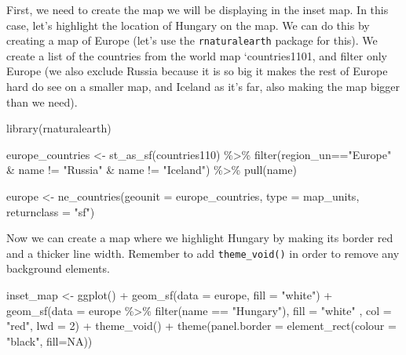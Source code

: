 \documentclass[
]{book}
\newenvironment{Shaded}{\begin{snugshade}}{\end{snugshade}}
\newcommand{\AttributeTok}[1]{\textcolor[rgb]{0.77,0.63,0.00}{#1}}
\newcommand{\ConstantTok}[1]{\textcolor[rgb]{0.00,0.00,0.00}{#1}}
\newcommand{\DecValTok}[1]{\textcolor[rgb]{0.00,0.00,0.81}{#1}}
\newcommand{\FunctionTok}[1]{\textcolor[rgb]{0.00,0.00,0.00}{#1}}
\newcommand{\NormalTok}[1]{#1}
\newcommand{\OtherTok}[1]{\textcolor[rgb]{0.56,0.35,0.01}{#1}}
\newcommand{\SpecialCharTok}[1]{\textcolor[rgb]{0.00,0.00,0.00}{#1}}
\newcommand{\StringTok}[1]{\textcolor[rgb]{0.31,0.60,0.02}{#1}}
\begin{document}
First, we need to create the map we will be displaying in the inset map. In this case, let's highlight the location of Hungary on the map. We can do this by creating a map of Europe (let's use the \texttt{rnaturalearth} package for this). We create a list of the countries from the world map `countries1101, and filter only Europe (we also exclude Russia because it is so big it makes the rest of Europe hard do see on a smaller map, and Iceland as it's far, also making the map bigger than we need).

\begin{Shaded}
\begin{Highlighting}[]
\FunctionTok{library}\NormalTok{(rnaturalearth)}

\NormalTok{europe\_countries }\OtherTok{\textless{}{-}} \FunctionTok{st\_as\_sf}\NormalTok{(countries110) }\SpecialCharTok{\%\textgreater{}\%} 
  \FunctionTok{filter}\NormalTok{(region\_un}\SpecialCharTok{==}\StringTok{"Europe"} \SpecialCharTok{\&}\NormalTok{ name }\SpecialCharTok{!=} \StringTok{"Russia"} \SpecialCharTok{\&}\NormalTok{ name }\SpecialCharTok{!=} \StringTok{"Iceland"}\NormalTok{) }\SpecialCharTok{\%\textgreater{}\%} \FunctionTok{pull}\NormalTok{(name)}

\NormalTok{europe }\OtherTok{\textless{}{-}} \FunctionTok{ne\_countries}\NormalTok{(}\AttributeTok{geounit =}\NormalTok{ europe\_countries, }\AttributeTok{type =} \StringTok{\textquotesingle{}map\_units\textquotesingle{}}\NormalTok{, }\AttributeTok{returnclass =} \StringTok{"sf"}\NormalTok{)}
\end{Highlighting}
\end{Shaded}

Now we can create a map where we highlight Hungary by making its border red and a thicker line width. Remember to add \texttt{theme\_void()} in order to remove any background elements.

\begin{Shaded}
\begin{Highlighting}[]
\NormalTok{inset\_map }\OtherTok{\textless{}{-}} \FunctionTok{ggplot}\NormalTok{() }\SpecialCharTok{+} 
  \FunctionTok{geom\_sf}\NormalTok{(}\AttributeTok{data =}\NormalTok{ europe, }\AttributeTok{fill =} \StringTok{"white"}\NormalTok{) }\SpecialCharTok{+} 
  \FunctionTok{geom\_sf}\NormalTok{(}\AttributeTok{data =}\NormalTok{ europe }\SpecialCharTok{\%\textgreater{}\%} \FunctionTok{filter}\NormalTok{(name }\SpecialCharTok{==} \StringTok{"Hungary"}\NormalTok{), }\AttributeTok{fill =} \StringTok{"white"}\NormalTok{ , }\AttributeTok{col =} \StringTok{"red"}\NormalTok{, }\AttributeTok{lwd =} \DecValTok{2}\NormalTok{) }\SpecialCharTok{+} 
  \FunctionTok{theme\_void}\NormalTok{() }\SpecialCharTok{+} 
  \FunctionTok{theme}\NormalTok{(}\AttributeTok{panel.border =} \FunctionTok{element\_rect}\NormalTok{(}\AttributeTok{colour =} \StringTok{"black"}\NormalTok{, }\AttributeTok{fill=}\ConstantTok{NA}\NormalTok{))}
\end{Highlighting}
\end{Shaded}
\end{document}

